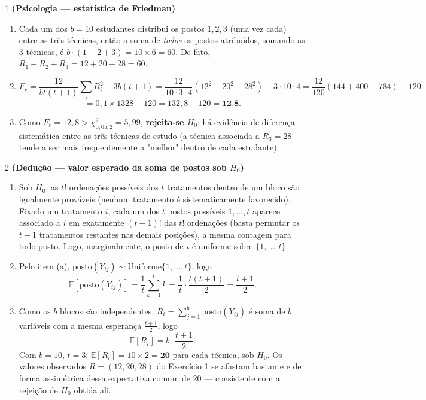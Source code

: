 \documentclass[11pt]{article}
\begin{document}

\begin{questao}{1} \textbf{(Psicologia --- estatística de Friedman)}
\end{questao}
\begin{solucao}
\begin{enumerate}[label=(\alph*)]
  \item Cada um dos $b=10$ estudantes distribui os postos $1,2,3$ (uma vez cada) entre as três
    técnicas, então a soma de \emph{todos} os postos atribuídos, somando as 3 técnicas, é
    $b\cdot(1+2+3) = 10\times 6 = 60$. De fato, $R_1+R_2+R_3=12+20+28=60$. \checkmark
  \item
    $$
    F_r = \frac{12}{bt(t+1)}\sum_i R_i^2 - 3b(t+1)
        = \frac{12}{10\cdot3\cdot4}(12^2+20^2+28^2) - 3\cdot10\cdot4
        = \frac{12}{120}(144+400+784) - 120
    $$
    $$
    = 0{,}1\times1328 - 120 = 132{,}8-120 = \textbf{12{,}8}.
    $$
  \item Como $F_r=12{,}8 > \chi^2_{0{,}05;2}=5{,}99$, \textbf{rejeita-se $H_0$}: há evidência de
    diferença sistemática entre as três técnicas de estudo (a técnica associada a $R_3=28$ tende
    a ser mais frequentemente a "melhor" dentro de cada estudante).
\end{enumerate}
\end{solucao}

\begin{questao}{2} \textbf{(Dedução --- valor esperado da soma de postos sob $H_0$)}
\end{questao}
\begin{solucao}
\begin{enumerate}[label=(\alph*)]
  \item Sob $H_0$, as $t!$ ordenações possíveis dos $t$ tratamentos dentro de um bloco são
    igualmente prováveis (nenhum tratamento é sistematicamente favorecido). Fixado um tratamento
    $i$, cada um dos $t$ postos possíveis $1,\dots,t$ aparece associado a $i$ em exatamente
    $(t-1)!$ das $t!$ ordenações (basta permutar os $t-1$ tratamentos restantes nas demais
    posições), a mesma contagem para todo posto. Logo, marginalmente, o posto de $i$ é uniforme
    sobre $\{1,\dots,t\}$.
  \item Pelo item (a), $\text{posto}(Y_{ij}) \sim \text{Uniforme}\{1,\dots,t\}$, logo
    $$
    \mathbb E[\text{posto}(Y_{ij})] = \frac{1}{t}\sum_{k=1}^t k = \frac{1}{t}\cdot\frac{t(t+1)}{2}
    = \frac{t+1}{2}.
    $$
  \item Como os $b$ blocos são independentes, $R_i=\sum_{j=1}^b \text{posto}(Y_{ij})$ é soma de
    $b$ variáveis com a mesma esperança $\frac{t+1}{2}$, logo
    $$
    \mathbb E[R_i] = b\cdot\frac{t+1}{2}.
    $$
    Com $b=10$, $t=3$: $\mathbb E[R_i]=10\times2=\textbf{20}$ para cada técnica, sob $H_0$. Os
    valores observados $R=(12,20,28)$ do Exercício 1 se afastam bastante e de forma assimétrica
    dessa expectativa comum de 20 — consistente com a rejeição de $H_0$ obtida ali.
\end{enumerate}
\end{solucao}
\end{document}
